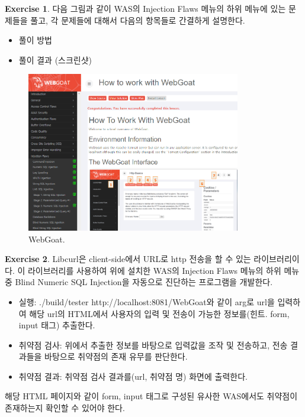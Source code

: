 \documentclass[a4paper, 11pt]{article}
\theoremstyle{definition}
\newtheorem{exercise}{Exercise}
\begin{document}
\begin{exercise}

다음 그림과 같이 WAS의 Injection Flaws 메뉴의 하위 메뉴에 있는 문제들을 풀고, 각 문제들에 대해서 다음의 항목들로 간결하게 설명한다. 

\begin{itemize}
  \item 풀이 방법
  \item 풀이 결과 (스크린샷)
\end{itemize}

\begin{figure}[h]
  \includegraphics[height=7cm]{webgoat.png}
  \caption{WebGoat.}
  \label{fig:webgoat}
\end{figure}

\end{exercise}

\begin{exercise}

Libcurl\cite{libcurl}은 client-side에서 URL로 http 전송을 할 수 있는 라이브러리이다. 이 라이브러리를 사용하여 위에 설치한 WAS의 Injection Flaws 메뉴의 하위 메뉴 중 Blind Numeric SQL Injection을 자동으로 진단하는 프로그램을 개발한다. 

\begin{itemize}
  \item 실행: ./build/tester http://localhost:8081/WebGoat와 같이 arg로 url을 입력하여 해당 url의 HTML에서 사용자의 입력 및 전송이 가능한 정보를(힌트. form, input 태그) 추출한다. \cite{href}
  \item 취약점 검사: 위에서 추출한 정보를 바탕으로 입력값을 조작 및 전송하고,\cite{post} 전송 결과들을 바탕으로 취약점의 존재 유무를 판단한다. \cite{getinfo}
  \item 취약점 결과: 취약점 검사 결과를(url, 취약점 명) 화면에 출력한다. 
\end{itemize}

해당 HTML 페이지와 같이 form, input 태그로 구성된 유사한 WAS에서도 취약점이 존재하는지 확인할 수 있어야 한다. 

\end{exercise}
\end{document}
